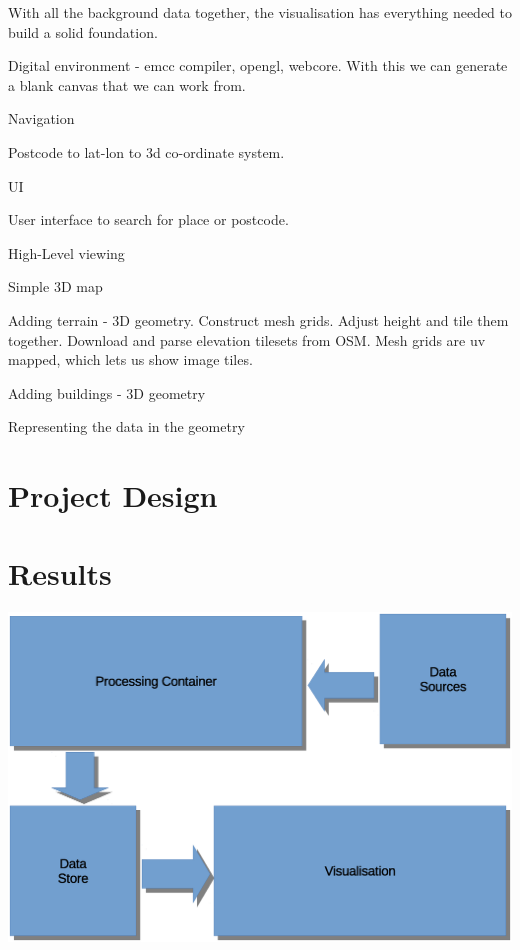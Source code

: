 \documentclass[10pt, a4paper]{article}
\begin{document}
\begin{multicols}{2}
With all the background data together, the visualisation has everything needed to build a solid foundation.

Digital environment - emcc compiler, opengl, webcore. With this we can generate a blank canvas that we can work from.

Navigation

Postcode to lat-lon to 3d co-ordinate system.

UI

User interface to search for place or postcode.

High-Level viewing

Simple 3D map

Adding terrain - 3D geometry. 
Construct mesh grids. 
Adjust height and tile them together. 
Download and parse elevation tilesets from OSM. 
Mesh grids are uv mapped, which lets us show image tiles.

Adding buildings - 3D geometry

Representing the data in the geometry




\section{Project Design}




\section{Results}

\includegraphics[scale=0.17]{design1.eps}


\end{multicols}
\end{document}
